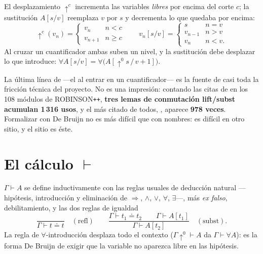 \begin{matematica}
El desplazamiento \(\uparrow^{c}\) incrementa las variables \emph{libres} por encima del corte
\(c\); la sustitución \(A[s/v]\) reemplaza \(v\) por \(s\) y decrementa lo que quedaba por encima:
\[
\uparrow^{c}(v_n) =
  \begin{cases} v_n & n < c\\ v_{n+1} & n \ge c\end{cases}
\qquad
v_n[s/v] =
  \begin{cases} s & n = v\\ v_{n-1} & n > v\\ v_n & n < v.\end{cases}
\]
Al cruzar un cuantificador ambas suben un nivel, y la sustitución debe desplazar lo que introduce:
\(\forall A [s/v] = \forall\bigl(A[\uparrow^{0}\!s\,/\,v{+}1]\bigr)\).
\end{matematica}


\begin{leccion}
La última línea de  —el  al entrar en un cuantificador— es
la fuente de casi toda la fricción técnica del proyecto. No es una impresión: contando las citas de
 en los 108 módulos de ROBINSON\texttt{++}, \textbf{tres lemas de conmutación
lift/subst acumulan 1\,316 usos}, y el más citado de todos, , aparece
\textbf{978 veces}. Formalizar con De Bruijn no es más difícil que con nombres: es difícil en otro
sitio, y el sitio es éste.
\end{leccion}

\section{El cálculo \texorpdfstring{$\vdash$}{|-}}

\begin{matematica}
\(\Gamma \vdash A\) se define inductivamente con las reglas usuales de deducción natural
—hipótesis, introducción y eliminación de \(\Rightarrow\), \(\wedge\), \(\vee\), \(\forall\),
\(\exists\)—, más \emph{ex falso}, debilitamiento, y las dos reglas de igualdad
\[
\frac{}{\Gamma \vdash t \doteq t}\quad(\text{refl})
\qquad
\frac{\Gamma \vdash t_1 \doteq t_2 \qquad \Gamma \vdash A[t_1]}{\Gamma \vdash A[t_2]}\quad(\text{subst}).
\]
La regla de \(\forall\)-introducción desplaza todo el contexto
(\(\Gamma\!\uparrow^{0} \vdash A\) da \(\Gamma \vdash \forall A\)): es la forma De Bruijn de exigir
que la variable no aparezca libre en las hipótesis.
\end{matematica}

